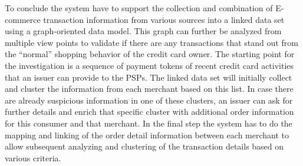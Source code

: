 To conclude the system have to support the collection and combination of \gls{E-commerce} transaction information from various sources into a linked data set using a graph-oriented data model. This graph can further be analyzed from multiple view points to validate if there are any transactions that stand out from the ``normal'' shopping behavior of the credit card owner. The starting point for the investigation is a sequence of payment tokens of recent credit card activities that an issuer can provide to the \gls{PSP}s. The linked data set will initially collect and cluster the information from each merchant based on this list. In case there are already suspicious information in one of these clusters, an issuer can ask for further details and enrich that specific cluster with additional order information for this consumer and that merchant. In the final step the system has to do the mapping and linking of the order detail information between each merchant to allow subsequent analyzing and clustering of the transaction details based on various criteria.

